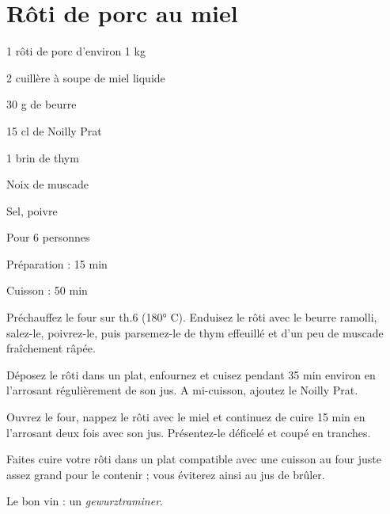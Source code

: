 \section[\normalsize{R\^oti de porc au miel}]{R\^oti de porc au miel}

\begin{ingredients}
\item 1 rôti de porc d’environ 1 kg
\item 2 cuill\`ere \`a soupe de miel liquide
\item	30 g de beurre
\item	15 cl de Noilly Prat
\item 1 brin de thym
\item Noix de muscade
\item Sel, poivre
\end{ingredients}
\begin{infos}
\item Pour 6 personnes
\item Préparation : 15 min	
\item Cuisson : 50 min
\end{infos}
\begin{etapes}
\item Pr\'echauffez le four sur th.6 (180° C). Enduisez le r\^oti avec le beurre ramolli, salez-le, poivrez-le, puis parsemez-le de thym effeuill\'e et d’un peu de muscade fra\^ichement  r\^ap\'ee.
\item D\'eposez le r\^oti dans un plat, enfournez et cuisez pendant 35 min environ en l’arrosant régulièrement de son jus. A mi-cuisson, ajoutez le Noilly Prat.
\item Ouvrez le four, nappez le r\^oti avec le miel et continuez de cuire 15 min en l’arrosant deux fois avec son jus. Présentez-le d\'eficel\'e et coup\'e en tranches.
\end{etapes}
\begin{conseils}
Faites cuire votre r\^oti dans un plat compatible avec une cuisson au four juste assez grand pour le contenir ; vous \'eviterez ainsi au jus de br\^uler.

Le bon vin : un \emph{gewurztraminer}.
\end{conseils}